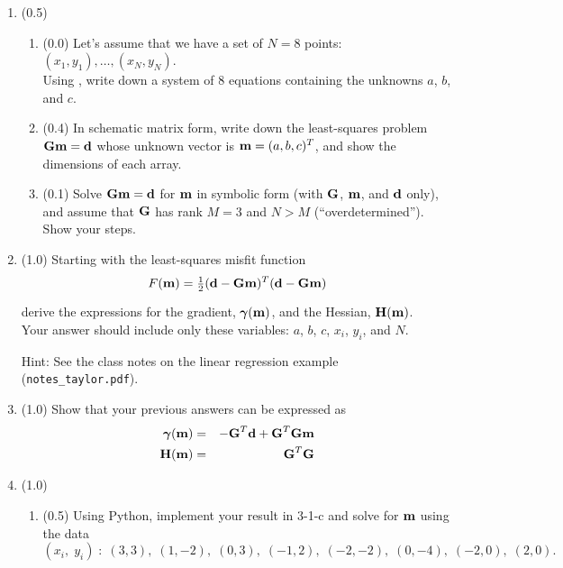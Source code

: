 \documentclass[11pt,titlepage,fleqn]{article}
\begin{document}
\begin{enumerate}
\item (0.5) 

\begin{enumerate}
\item (0.0) Let's assume that we have a set of $N=8$ points: $(x_1,y_1), \ldots, (x_N,y_N)$. \\
Using , write down a system of 8 equations containing the unknowns $a$, $b$, and $c$.

\item  (0.4) In schematic matrix form, write down the least-squares problem $\mbox{${\bf G}$}\mbox{${\bf m}$}=\mbox{${\bf d}$}$ whose unknown vector is $\mbox{${\bf m}$} = (a,b,c)^T$, and show the dimensions of each array.

\item (0.1) Solve $\mbox{${\bf G}$}\mbox{${\bf m}$}=\mbox{${\bf d}$}$ for $\mbox{${\bf m}$}$ in symbolic form (\ie with $\mbox{${\bf G}$}$, $\mbox{${\bf m}$}$, and $\mbox{${\bf d}$}$ only), and assume that $\mbox{${\bf G}$}$ has rank $M = 3$ and $N > M$ (``overdetermined''). Show your steps.
\end{enumerate}


\item (1.0) Starting with the least-squares misfit function
%
\begin{equation}
F(\bem) = \hlf (\bd - \bG\bem)^T(\bd - \bG\bem)
\end{equation}
%
derive the expressions for the gradient, $\mbox{\boldmath $\bf \gamma$}(\mbox{${\bf m}$})$, and the Hessian, $\mbox{${\bf H}$}(\mbox{${\bf m}$})$. \\
Your answer should include only these variables: $a$, $b$, $c$, $x_i$, $y_i$, and $N$.

Hint: See the class notes on the linear regression example (\verb+notes_taylor.pdf+).


\item (1.0) Show that your previous answers can be expressed as
%
\begin{eqnarray}
\mbox{\boldmath $\bf \gamma$}(\mbox{${\bf m}$}) &=& -\mbox{${\bf G}$}^T\mbox{${\bf d}$} + \mbox{${\bf G}$}^T\mbox{${\bf G}$}\mbox{${\bf m}$}
\\
\mbox{${\bf H}$}(\mbox{${\bf m}$}) &=& \mbox{${\bf G}$}^T\mbox{${\bf G}$}
\end{eqnarray}


\item (1.0)
\begin{enumerate}
\item (0.5) Using Python, implement your result in 3-1-c and solve for $\mbox{${\bf m}$}$ using the data
%
\begin{equation*}
(x_i,\;y_i) \;:\; (3,3),\;(1,-2),\;(0,3),\;(-1,2),\;(-2,-2),\;(0,-4),\;(-2,0),\;(2,0).
\end{equation*}


\end{enumerate}
\end{enumerate}
\end{document}
